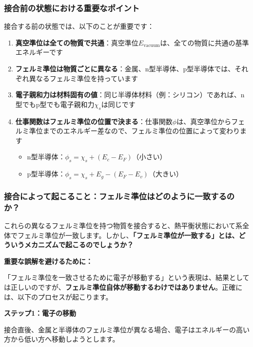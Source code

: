 \subsubsection{接合前の状態における重要なポイント}

接合する前の状態では、以下のことが重要です：

\begin{enumerate}
\item \textbf{真空準位は全ての物質で共通}：真空準位$E_{\text{vacuum}}$は、全ての物質に共通の基準エネルギーです

\item \textbf{フェルミ準位は物質ごとに異なる}：金属、n型半導体、p型半導体では、それぞれ異なるフェルミ準位を持っています

\item \textbf{電子親和力は材料固有の値}：同じ半導体材料（例：シリコン）であれば、n型でもp型でも電子親和力$\chi_s$は同じです

\item \textbf{仕事関数はフェルミ準位の位置で決まる}：仕事関数$\phi$は、真空準位からフェルミ準位までのエネルギー差なので、フェルミ準位の位置によって変わります
\begin{itemize}
\item n型半導体：$\phi_s = \chi_s + (E_c - E_F)$（小さい）
\item p型半導体：$\phi_s = \chi_s + E_g - (E_F - E_v)$（大きい）
\end{itemize}
\end{enumerate}

\subsubsection{接合によって起こること：フェルミ準位はどのように一致するのか？}

これらの異なるフェルミ準位を持つ物質を接合すると、熱平衡状態において系全体でフェルミ準位が一致します。しかし、\textbf{「フェルミ準位が一致する」とは、どういうメカニズムで起こるのでしょうか？}

\textbf{重要な誤解を避けるために：}

「フェルミ準位を一致させるために電子が移動する」という表現は、結果としては正しいのですが、\textbf{フェルミ準位自体が移動するわけではありません}。正確には、以下のプロセスが起こります。

\textbf{ステップ1：電子の移動}

接合直後、金属と半導体のフェルミ準位が異なる場合、電子はエネルギーの高い方から低い方へ移動しようとします。

